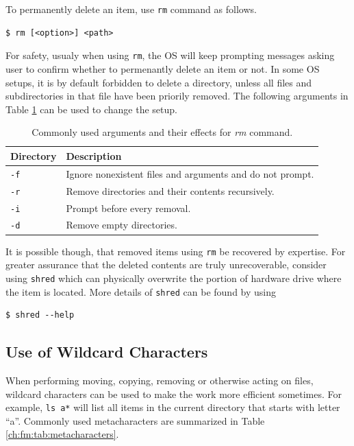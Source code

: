 To permanently delete an item, use \verb|rm| command as follows.
\begin{lstlisting}
$ rm [<option>] <path>
\end{lstlisting}
For safety, usualy when using \verb|rm|, the OS will keep prompting messages asking user to confirm whether to permenantly delete an item or not. In some OS setups, it is by default forbidden to delete a directory, unless all files and subdirectories in that file have been priorily removed. The following arguments in Table \ref{ch:fm:tab:rmcommandargument} can be used to change the setup.

\begin{table}
  \centering \caption{Commonly used arguments and their effects for \textit{rm} command.}\label{ch:fm:tab:rmcommandargument}
  \begin{tabularx}{\textwidth}{lX}
    \hline
    Directory & Description \\ \hline
    \verb|-f| & Ignore nonexistent files and arguments and do not prompt. \\ 
    \verb|-r| & Remove directories and their contents recursively. \\ 
    \verb|-i| & Prompt before every removal. \\ 
    \verb|-d| & Remove empty directories. \\
    \hline
  \end{tabularx}
\end{table}

It is possible though, that removed items using \verb|rm| be recovered by expertise. For greater assurance that the deleted contents are truly unrecoverable, consider using \verb|shred| which can physically overwrite the portion of hardware drive where the item is located. More details of \verb|shred| can be found by using
\begin{lstlisting}
$ shred --help
\end{lstlisting}

\subsection{Use of Wildcard Characters}

When performing moving, copying, removing or otherwise acting on files, wildcard characters can be used to make the work more efficient sometimes. For example, \verb|ls a*| will list all items in the current directory that starts with letter ``a''. Commonly used metacharacters are summarized in Table \ref{ch:fm:tab:metacharacters}.

